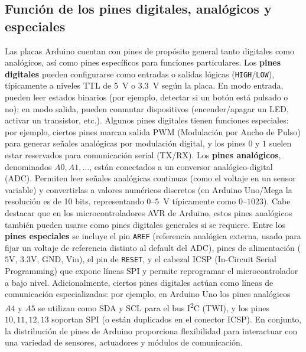 \documentclass{article}
\begin{document}
\subsection{Función de los pines digitales, analógicos y especiales}
Las placas Arduino cuentan con pines de propósito general tanto digitales como analógicos, así como pines específicos para funciones particulares. Los \textbf{pines digitales} pueden configurarse como entradas o salidas lógicas (\texttt{HIGH}/\texttt{LOW}), típicamente a niveles TTL de 5~V o 3.3~V según la placa. En modo entrada, pueden leer estados binarios (por ejemplo, detectar si un botón está pulsado o no); en modo salida, pueden conmutar dispositivos (encender/apagar un LED, activar un transistor, etc.).\cite{ArduinoDigitalPins} Algunos pines digitales tienen funciones especiales: por ejemplo, ciertos pines marcan salida PWM (Modulación por Ancho de Pulso) para generar señales analógicas por modulación digital, y los pines $0$ y $1$ suelen estar reservados para comunicación serial (TX/RX). Los \textbf{pines analógicos}, denominados $A0, A1, \dots$, están conectados a un conversor analógico-digital (ADC). Permiten leer señales analógicas continuas (como el voltaje en un sensor variable) y convertirlas a valores numéricos discretos (en Arduino Uno/Mega la resolución es de 10 bits, representando $0$–$5$~V típicamente como $0$–$1023$). Cabe destacar que en los microcontroladores AVR de Arduino, estos pines analógicos también pueden usarse como pines digitales generales si se requiere.\cite{ArduinoAnalogPins} Entre los \textbf{pines especiales} se incluye el pin \texttt{AREF} (referencia analógica externa, usado para fijar un voltaje de referencia distinto al default del ADC), pines de alimentación ($5$V, $3.3$V, GND, Vin), el pin de \texttt{RESET}, y el cabezal ICSP (In-Circuit Serial Programming) que expone líneas SPI y permite reprogramar el microcontrolador a bajo nivel. Adicionalmente, ciertos pines digitales actúan como líneas de comunicación especializadas: por ejemplo, en Arduino Uno los pines analógicos $A4$ y $A5$ se utilizan como SDA y SCL para el bus I\textsuperscript{2}C (TWI), y los pines $10,11,12,13$ soportan SPI (o están duplicados en el conector ICSP). En conjunto, la distribución de pines de Arduino proporciona flexibilidad para interactuar con una variedad de sensores, actuadores y módulos de comunicación.
\end{document}
